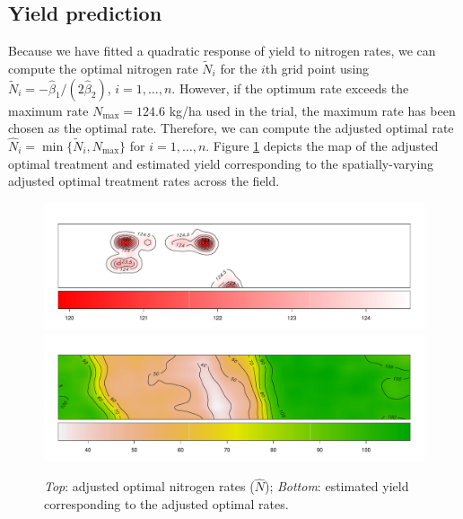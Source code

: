 \documentclass[a4paper]{article}   	%
\begin{document}
	\subsection{Yield prediction}
	
%	
		
	Because we have fitted a quadratic response of yield to nitrogen rates, we can compute the optimal nitrogen rate $\tilde{N}_{i}$ for the $i$th grid point using $\tilde{N}_{i} = -\hat{\beta}_{1}/(2\hat{\beta}_{2})$, $i=1,\ldots,n$. However, if the optimum rate exceeds the maximum rate $N_{\mbox{max}} = 124.6$ kg/ha used in the trial, the maximum rate has been chosen as the optimal rate. Therefore, we can compute the adjusted optimal rate $\hat{N}_i = \min\{ \tilde{N}_i, N_{\mbox{max}}\}$ for $i=1,\ldots,n$. Figure \ref{fig:optN} depicts the map of the adjusted optimal treatment and estimated yield corresponding to the spatially-varying adjusted optimal treatment rates across the field. %
		
	\begin{figure}[!htp]
		\centering	
		\includegraphics[width=\textwidth]{Images/ST_opNitrogen_v2}
		\includegraphics[width=\textwidth]{Images/ST_opYield}
		\caption{\textit{Top}: adjusted optimal nitrogen rates ($\hat{N}$); \textit{Bottom}: estimated yield corresponding to the adjusted optimal rates.}\label{fig:optN}
	\end{figure}	
	
\end{document}
